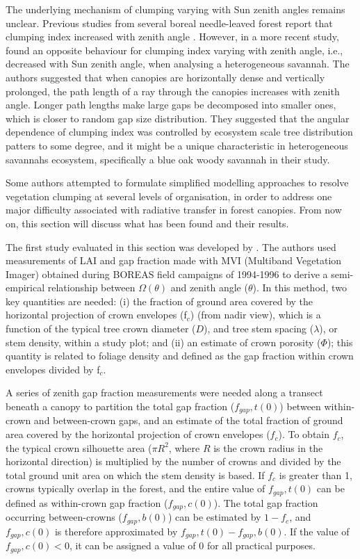 The underlying mechanism of clumping varying with Sun zenith angles remains unclear. Previous studies from several boreal needle-leaved forest report that clumping index increased with zenith angle \citep{Chen1996,Kucharik1999}. However, in a more recent study, \citet{Ryu2010} found an opposite behaviour for clumping index varying with zenith angle, i.e., decreased with Sun zenith angle, when analysing a heterogeneous savannah. The authors suggested that when canopies are horizontally dense and vertically prolonged, the path length of a ray through the canopies increases with zenith angle. Longer path lengths make large gaps be decomposed into smaller ones, which is closer to random gap size distribution. They suggested that the angular dependence of clumping index was controlled by ecosystem scale tree distribution patters to some degree, and it might be a unique characteristic in heterogeneous savannahs ecosystem, specifically a blue oak woody savannah in their study. 

Some authors attempted to formulate simplified modelling approaches to resolve vegetation clumping at several levels of organisation, in order to address one major difficulty associated with radiative transfer in forest canopies. From now on, this section will discuss what has been found and their results.

The first study evaluated in this section was developed by \citet{Kucharik1999}. The authors used measurements of LAI and gap fraction made with MVI (Multiband Vegetation Imager) \citep{Kucharik1997} obtained during BOREAS \citep{Sellers1997} field campaigns of 1994-1996 to derive a semi-empirical \citep{Ni-Meister2010} relationship between $\Omega(\theta)$ and zenith angle ($\theta$). In this method, two key quantities are needed: (i) the fraction of ground area covered by the horizontal projection of crown envelopes (f$_c$) (from nadir view), which is a function of the typical tree crown diameter ($D$), and tree stem spacing ($\lambda$), or stem density, within a study plot; and (ii) an estimate of crown porosity ($\Phi$); this quantity is related to foliage density and defined as the gap fraction within crown envelopes divided by f$_c$.

A series of zenith gap fraction measurements were needed along a transect beneath a canopy to partition the total gap fraction ($f_{gap},t(0)$) between within-crown and between-crown gaps, and  an estimate of the total fraction of ground area covered by the horizontal projection of crown envelopes ($f_c$). To obtain $f_c$, the typical crown silhouette area ($\pi R^2$, where $R$ is the crown radius in the horizontal direction) is multiplied by the number of crowns and divided by the total ground unit area on which the stem density is based. If $f_c$ is greater than 1, crowns typically overlap in the forest, and the entire value of $f_{gap},t(0)$ can be defined as within-crown gap fraction ($f_{gap},c(0)$). The total gap fraction occurring between-crowns ($f_{gap},b(0)$) can be estimated by $1 - f_c$, and $f_{gap},c(0)$ is therefore approximated by $f_{gap},t(0) - f_{gap},b(0)$. If the value of $f_{gap},c(0) < 0$, it can be assigned a value of 0 for all practical purposes. 

